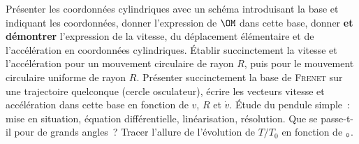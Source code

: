 \documentclass[a4paper, 10pt, final, garamond]{book}
\begin{document}
\begin{enumerate}[resume]
	\litem{17pt}{\strrr}%
	Présenter les coordonnées cylindriques avec un schéma introduisant la
	base et indiquant les coordonnées, donner l'expression de $\OM$ dans
	cette base, donner \textbf{et démontrer} l'expression de la vitesse, du
	déplacement élémentaire et de l'accélération en coordonnées cylindriques.
	\litem{17pt}{\str}%
	Établir succinctement la vitesse et l'accélération pour un mouvement
	circulaire de rayon $R$, puis pour le mouvement circulaire uniforme de rayon
	$R$.
	\litem{17pt}{\strr}%
	Présenter succinctement la base de \textsc{Frenet} sur une trajectoire
	quelconque (cercle osculateur), écrire les vecteurs vitesse et
	accélération dans cette base en fonction de $v$, $R$ et $\dot{v}$.
	\litem{17pt}{\strr}%
	Étude du pendule simple~: mise en situation, équation différentielle,
	linéarisation, résolution. Que se passe-t-il pour de grands angles~? Tracer
	l'allure de l'évolution de $T/T_0$ en fonction de $\tt_0$.
\end{enumerate}
\end{document}

